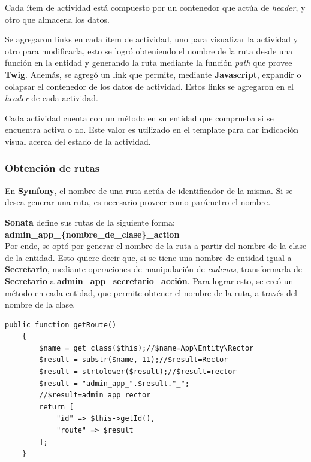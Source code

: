 Cada ítem de actividad está compuesto por un contenedor que actúa de \textit{header}, y otro que almacena los datos\@.




Se agregaron links en cada ítem de actividad, uno para visualizar la actividad y otro para modificarla, esto se logró obteniendo el nombre de la ruta desde una función en la
entidad y generando la ruta mediante la función \textit{path} que provee \textbf{Twig}\@. Además, se agregó un link que permite, mediante \textbf{Javascript}, expandir o colapsar
el contenedor de los datos de actividad\@.  Estos links se agregaron en el \textit{header} de cada actividad\@.

Cada actividad cuenta con un método en su entidad que comprueba si se encuentra activa o no. Este valor es utilizado en el template para dar indicación visual acerca del estado de la actividad\@.

\subsubsection{Obtención de rutas}%
\label{ssub:obtención_de_rutas}
En \textbf{Symfony}, el nombre de una ruta actúa de identificador de la misma\@. Si se desea generar una ruta, es necesario proveer como parámetro el nombre.


\textbf{Sonata} define sus rutas de la siguiente forma: \\

\textbf{admin\_app\_\{nombre\_de\_clase\}\_action} \\

Por ende, se optó por generar el nombre de la ruta a partir del nombre de la clase de la entidad. Esto quiere decir que, si se tiene una nombre de entidad igual a \textbf{Secretario}, mediante
operaciones de
manipulación de \textit{cadenas}, transformarla de \textbf{Secretario} a \textbf{admin\_app\_secretario\_acción}\@.  Para lograr esto, se creó un método en cada entidad, que permite obtener el nombre de
la ruta, a través del nombre de la clase.


\begin{lstlisting}[caption={Obtención del nombre de una ruta.\\Fuente: Elaboración propia.}, label={lst:ruta}]
    public function getRoute()
    {
        $name = get_class($this);//$name=App\Entity\Rector
        $result = substr($name, 11);//$result=Rector
        $result = strtolower($result);//$result=rector
        $result = "admin_app_".$result."_";
        //$result=admin_app_rector_
        return [
            "id" => $this->getId(),
            "route" => $result
        ];
    }
\end{lstlisting}

